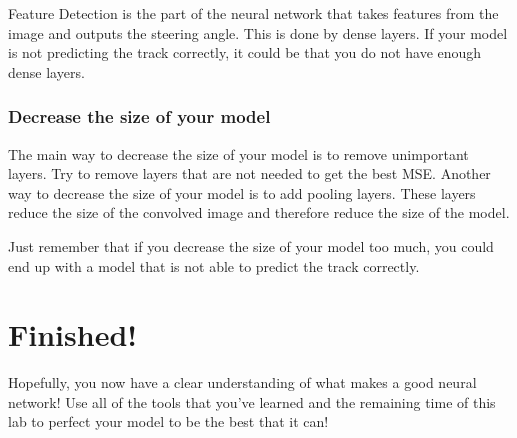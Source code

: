 \documentclass[11pt]{report}
\begin{document}
Feature Detection is the part of the neural network that takes features from the image and outputs the steering angle. This is done by dense layers. If your model is not predicting the track correctly, it could be that you do not have enough dense layers.

\subsection{Decrease the size of your model}

The main way to decrease the size of your model is to remove unimportant layers. Try to remove layers that are not needed to get the best MSE. Another way to decrease the size of your model is to add pooling layers. These layers reduce the size of the convolved image and therefore reduce the size of the model.

Just remember that if you decrease the size of your model too much, you could end up with a model that is not able to predict the track correctly.

\chapter{Finished!}
Hopefully, you now have a clear understanding of what makes a good neural network! Use all of the tools that you've learned and the remaining time of this lab to perfect your model to be the best that it can!
\end{document}
